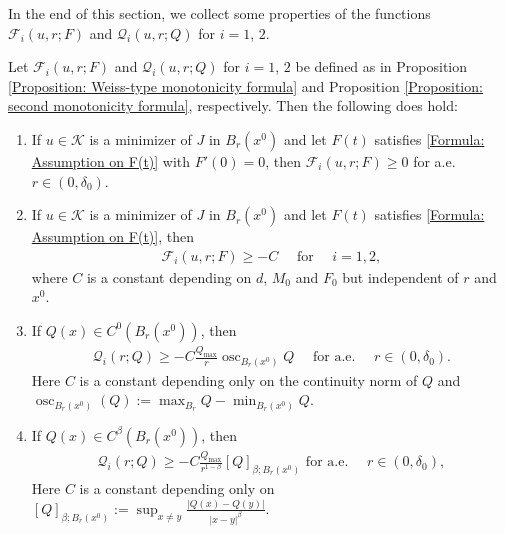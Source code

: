 \documentclass[11pt,reqno]{amsart}
\begin{document}
In the end of this section, we collect some properties of the functions $\mathcal{F}_{i}(u,r;F)$ and $\mathcal{Q}_{i}(u,r;Q)$ for $i=1$, $2$.
\begin{proposition}\label{Proposition: properties of F and Q}
	Let $\mathcal{F}_{i}(u,r;F)$ and $\mathcal{Q}_{i}(u,r;Q)$ for $i=1$, $2$  be defined as in Proposition \ref{Proposition: Weiss-type monotonicity formula} and Proposition \ref{Proposition: second monotonicity formula}, respectively. Then the following does hold:
	\begin{enumerate}
		\item If $u\in\mathcal{K}$ is a minimizer of $J$ in $B_{r}(x^{0})$ and let $F(t)$ satisfies \eqref{Formula: Assumption on F(t)} with $F'(0)=0$, then $\mathcal{F}_{i}(u,r;F)\geqslant0$ for a.e. $r\in(0,\delta_{0})$.
		\item If $u\in\mathcal{K}$ is a minimizer of $J$ in $B_{r}(x^{0})$ and let $F(t)$ satisfies \eqref{Formula: Assumption on F(t)}, then
		\begin{align}\label{Formula: M(26)}
			\mathcal{F}_{i}(u,r;F)\geqslant-C\quad\text{ for }\quad i=1,2,
		\end{align}
	   where $C$ is a constant depending on $d$, $M_{0}$ and $F_{0}$ but independent of $r$ and $x^{0}$.
	   \item If $Q(x)\in C^{0}(B_{r}(x^{0}))$, then
	   \begin{align}\label{Formula: M(27)}
	   	    \mathcal{Q}_{i}(r;Q)\geqslant-C\frac{Q_{\mathrm{max}}}{r}\operatorname{osc}_{B_{r}(x^{0})}Q\quad\text{ for a.e. }\quad r\in(0,\delta_{0}).
	   \end{align}
      Here $C$ is a constant depending only on the continuity norm of $Q$ and $\operatorname{osc}_{B_{r}(x^{0})}(Q):=\max_{B_{r}}Q-\min_{B_{r}(x^{0})}Q$.
      \item If $Q(x)\in C^{\beta}(B_{r}(x^{0}))$, then 
      \begin{align}\label{Formula: M(28)}
      	   \mathcal{Q}_{i}(r;Q)\geqslant-C\frac{Q_{\mathrm{max}}}{r^{1-\beta}}[Q]_{\beta;B_{r}(x^{0})}\text{ for a.e. }\quad r\in(0,\delta_{0}),
      \end{align}
      Here $C$ is a constant depending only on $[Q]_{\beta;B_{r}(x^{0})}:=\sup_{x\neq y}\frac{|Q(x)-Q(y)|}{|x-y|^{\beta}}$.
	\end{enumerate}
\end{proposition}
\end{document}
